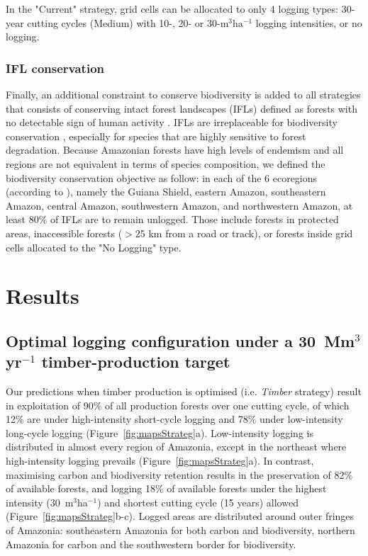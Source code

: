 \documentclass{article}
\begin{document}
In the "Current" strategy, grid cells can be allocated to only 4 logging types: 30-year cutting cycles (Medium) with 10-, 20- or 30-m$^3$ha$^{-1}$ logging intensities, or no logging. 

\subsubsection{IFL conservation}

Finally, an additional constraint to conserve biodiversity is added to all strategies that consists of conserving intact forest landscapes (IFLs) defined as forests with no detectable sign of human activity \cite{Potapov2017}. IFLs are irreplaceable for biodiversity conservation \cite{Gibson2011}, especially for species that are highly sensitive to forest degradation. Because Amazonian forests have high levels of endemism and all regions are not equivalent in terms of species composition, we defined the biodiversity conservation objective as follow: in each of the 6 ecoregions (according to \cite{TerSteege2013}), namely the Guiana Shield, eastern Amazon, southeastern Amazon, central Amazon, southwestern Amazon, and northwestern Amazon, at least 80\% of IFLs are to remain unlogged. Those include forests in protected areas, inaccessible forests ($>$25 km from a road or track), or forests inside grid cells allocated to the "No Logging" type. 


\section{Results}

\subsection{Optimal logging configuration under a 30~Mm$^3$yr$^{-1}$ timber-production target}

Our predictions when timber production is optimised (i.e. \textit{Timber} strategy) result in exploitation of 90\% of all production forests over one cutting cycle, of which 12\% are under high-intensity short-cycle logging and 78\% under low-intensity long-cycle logging (Figure~\ref{fig:mapsStrateg}a). Low-intensity logging is distributed in almost every region of Amazonia, except in the northeast where high-intensity logging prevails (Figure~\ref{fig:mapsStrateg}a). In contrast, maximising carbon and biodiversity retention results in the preservation of 82\% of available forests, and logging 18\% of available forests under the highest intensity (30~m$^3$ha$^{-1}$) and shortest cutting cycle (15 years) allowed (Figure~\ref{fig:mapsStrateg}b-c). Logged areas are distributed around outer fringes of Amazonia: southeastern Amazonia for both carbon and biodiversity, northern Amazonia for carbon and the southwestern border for biodiversity. 
\end{document}
